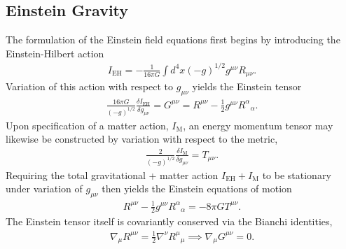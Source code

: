 \documentclass[10pt,letterpaper]{article}
\numberwithin{equation}{section}
\begin{document}
\subsection{Einstein Gravity}
\label{sec:Einstein Gravity}
\indent The formulation of the Einstein field equations first begins by introducing the Einstein-Hilbert action \cite{Weinberg1972}
\begin{eqnarray}
I_{\text{EH}} = -\frac{1}{16\pi G} \int d^4x (-g)^{1/2}  g^{\mu\nu}R_{\mu\nu}.
\end{eqnarray}
Variation of this action with respect to $g_{\mu\nu}$ yields the Einstein tensor
\begin{eqnarray}
\frac{16\pi G}{(-g)^{1/2}} \frac{\delta I_{\text{EH}}}{\delta g_{\mu\nu}}= G^{\mu\nu} = R^{\mu\nu} - \frac{1}{2}g^{\mu\nu}R^\alpha{}_\alpha.
\label{Eintensor}
\end{eqnarray}
Upon specification of a matter action, $I_\text{M}$, an energy momentum tensor may likewise be constructed by variation with respect to the metric,
\begin{eqnarray}
\frac{2}{(-g)^{1/2}} \frac{ \delta I_\text{M}}{\delta g_{\mu\nu}} = T_{\mu\nu}. 
\end{eqnarray}
Requiring the total gravitational + matter action $I_{\text{EH}}+I_\text{M}$ to be stationary under variation of $g_{\mu\nu}$ then yields the Einstein equations of motion
\begin{eqnarray}
R^{\mu\nu} - \frac{1}{2}g^{\mu\nu}R^\alpha{}_\alpha = -8\pi G T^{\mu\nu}.
\label{EinEOM}
\end{eqnarray}
The Einstein tensor itself is covariantly conserved via the Bianchi identities,
\begin{eqnarray}
\nabla_\mu R^{\mu\nu} = \frac{1}{2}\nabla^\nu R^\mu{}_\mu \implies \nabla_\mu G^{\mu\nu} = 0.
\end{eqnarray}
\end{document}
